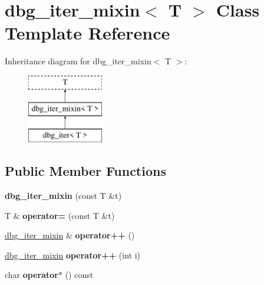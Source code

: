 \hypertarget{classdbg__iter__mixin}{}\section{dbg\+\_\+iter\+\_\+mixin$<$ T $>$ Class Template Reference}
\label{classdbg__iter__mixin}
Inheritance diagram for dbg\+\_\+iter\+\_\+mixin$<$ T $>$\+:\begin{figure}[H]
\begin{center}
\leavevmode
\includegraphics[height=3.000000cm]{classdbg__iter__mixin}
\end{center}
\end{figure}
\subsection*{Public Member Functions}
\begin{DoxyCompactItemize}
\item 
\mbox{\label{classdbg__iter__mixin_a6ceedc5d08295832fa9f187c0d65230b}} 
{\bfseries dbg\+\_\+iter\+\_\+mixin} (const T \&t)
\item 
\mbox{\label{classdbg__iter__mixin_a53407c1f42cd70e41b4e4eda67cb0060}} 
T \& {\bfseries operator=} (const T \&t)
\item 
\mbox{\label{classdbg__iter__mixin_a6286a52402e0778a2082debda37aa82d}} 
\hyperlink{classdbg__iter__mixin}{dbg\+\_\+iter\+\_\+mixin} \& {\bfseries operator++} ()
\item 
\mbox{\label{classdbg__iter__mixin_a26147ae8a48ff70270e9abc454792df3}} 
\hyperlink{classdbg__iter__mixin}{dbg\+\_\+iter\+\_\+mixin} {\bfseries operator++} (int i)
\item 
\mbox{\label{classdbg__iter__mixin_add0fa478c29c88afea63f368d1474b77}} 
char {\bfseries operator$\ast$} () const
\end{DoxyCompactItemize}
